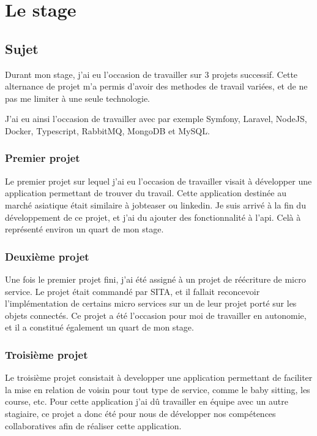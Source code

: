 \documentclass[../rapport.tex]{subfiles}
\begin{document}
    \chapter{Le stage}
    \section{Sujet}
        Durant mon stage, j'ai eu l'occasion de travailler sur 3 projets successif.
        Cette alternance de projet m'a permis d'avoir des methodes de travail variées,
        et de ne pas me limiter à une seule technologie.

        J'ai eu ainsi l'occasion de travailler avec par exemple Symfony,
        Laravel, NodeJS, Docker, Typescript, RabbitMQ, MongoDB et MySQL.

        \subsection{Premier projet}
        Le premier projet sur lequel j'ai eu l'occasion de travailler visait à
        développer une application permettant de trouver du travail. Cette
        application destinée au marché asiatique était similaire à jobteaser ou
        linkedin. Je suis arrivé à la fin du développement de ce projet, et j'ai du 
        ajouter des fonctionnalité à l'\gls{api}. Celà à représenté environ un quart de mon
        stage.

        \subsection{Deuxième projet}
        Une fois le premier projet fini, j'ai été assigné à un projet de
        réécriture de micro service. 
        Le projet était commandé par SITA, et il fallait reconcevoir l'implémentation
        de certains micro services sur un de leur projet porté sur les objets
        connectés.
        Ce projet a été l'occasion pour moi de travailler en autonomie, et il a
        constitué également un quart de mon stage.

        \subsection{Troisième projet}
        Le troisième projet consistait à developper une application permettant
        de faciliter la mise en relation de voisin pour tout type de service, comme
        le baby sitting, les course, etc. Pour cette application j'ai dû travailler en
        équipe avec un autre stagiaire, ce projet a donc été pour nous de développer 
        nos compétences collaboratives afin de réaliser cette application.
\end{document}
